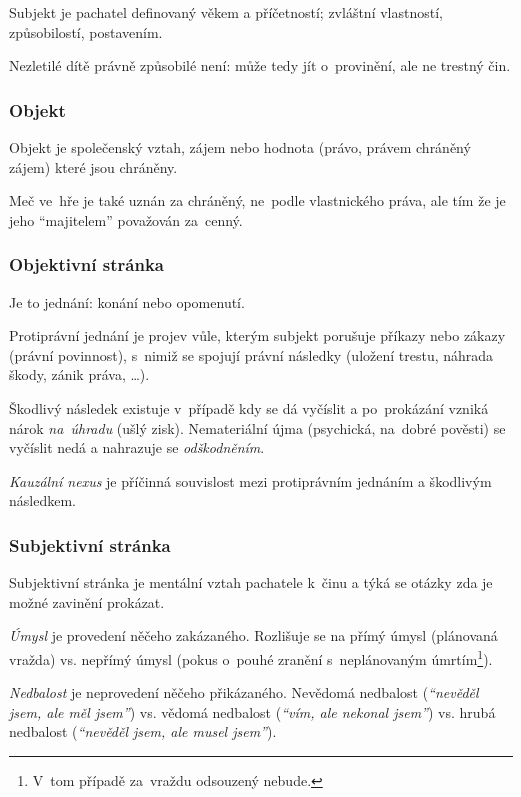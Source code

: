 Subjekt je pachatel definovaný věkem a příčetností; zvláštní vlastností, způsobilostí, postavením.

Nezletilé dítě právně způsobilé není: může tedy jít o~provinění, ale ne trestný čin.


\subsubsection{Objekt}

Objekt je společenský vztah, zájem nebo hodnota (právo, právem chráněný zájem) které jsou chráněny.

Meč ve~hře je také uznán za chráněný, ne~podle vlastnického práva, ale tím že je jeho \enquote{majitelem} považován za~cenný.


\subsubsection{Objektivní stránka}

Je to jednání: konání nebo opomenutí.

Protiprávní jednání je projev vůle, kterým subjekt porušuje příkazy nebo zákazy (právní povinnost), s~nimiž se spojují právní následky (uložení trestu, náhrada škody, zánik práva, \dots).

Škodlivý následek existuje v~případě kdy se dá vyčíslit a po~prokázání vzniká nárok \emph{na~úhradu} (ušlý zisk).
Nemateriální újma (psychická, na~dobré pověsti) se vyčíslit nedá a nahrazuje se \emph{odškodněním}.

\emph{Kauzální nexus} je příčinná souvislost mezi protiprávním jednáním a škodlivým následkem.


\subsubsection{Subjektivní stránka}

Subjektivní stránka je mentální vztah pachatele k~činu a týká se otázky zda je možné zavinění prokázat.

\emph{Úmysl} je provedení něčeho zakázaného.
Rozlišuje se na přímý úmysl (plánovaná vražda) vs. nepřímý úmysl (pokus o~pouhé zranění s~neplánovaným úmrtím\footnote{V~tom případě za~vraždu odsouzený nebude.}).

\emph{Nedbalost} je neprovedení něčeho přikázaného.
Nevědomá nedbalost (\emph{\enquote{nevěděl jsem, ale měl jsem}}) vs.
vědomá nedbalost (\emph{\enquote{vím, ale nekonal jsem}}) vs.
hrubá nedbalost (\emph{\enquote{nevěděl jsem, ale musel jsem}}).


